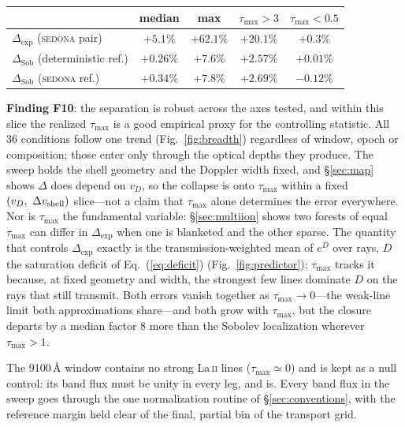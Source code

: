 \documentclass[fleqn,usenatbib]{mnras}
\newcommand{\dexp}{\Delta_{\mathrm{exp}}}
\newcommand{\dsobp}{\Delta_{\mathrm{Sob}}}
\begin{document}
\begin{table}
\centering
\small
\begin{tabular}{@{}lcccc@{}}
\toprule
 & median & max & $\tau_{\max}>3$ & $\tau_{\max}<0.5$ \\
\midrule
$\dexp$ (\textsc{sedona} pair) & $+5.1\%$ & $\mathbf{+62.1\%}$ & $+20.1\%$ & $+0.3\%$ \\
$\dsobp$ (deterministic ref.) & $+0.26\%$ & $\mathbf{+7.6\%}$ & $+2.57\%$ & $+0.01\%$ \\
$\dsobp$ (\textsc{sedona} ref.) & $+0.34\%$ & $+7.8\%$ & $+2.69\%$ & $-0.12\%$ \\
\bottomrule
\end{tabular}
\end{table}

\textbf{Finding F10}: the separation is robust across the axes tested, and
within this slice the realized $\tau_{\max}$ is a good empirical proxy for the
controlling statistic. All 36 conditions follow one trend
(Fig.~\ref{fig:breadth}) regardless of window, epoch or composition; those
enter only through the optical depths they produce. The sweep holds the shell
geometry and the Doppler width fixed, and \S\ref{sec:map} shows $\Delta$ does
depend on $v_D$, so the collapse is onto $\tau_{\max}$ within a fixed
$(v_D,\ \Delta v_{\rm shell})$ slice---not a claim that $\tau_{\max}$ alone
determines the error everywhere. Nor is $\tau_{\max}$ the fundamental
variable: \S\ref{sec:multiion} shows two forests of equal $\tau_{\max}$ can
differ in $\dexp$ when one is blanketed and the other sparse. The quantity
that controls $\dexp$ exactly is the transmission-weighted mean of $e^{D}$
over rays, $D$ the saturation deficit of Eq.~(\ref{eq:deficit})
(Fig.~\ref{fig:predictor}); $\tau_{\max}$ tracks it because, at fixed
geometry and width, the strongest few lines dominate $D$ on the rays that
still transmit. Both errors vanish together as $\tau_{\max}\to0$---the
weak-line limit both approximations share---and both grow with $\tau_{\max}$,
but the closure departs by a median factor $8$ more than
the Sobolev localization wherever $\tau_{\max}>1$.

The 9100\,\AA{} window contains no strong La\,\textsc{ii} lines
($\tau_{\max}\simeq0$) and is kept as a null control: its band flux must be
unity in every leg, and is. Every band flux in the sweep goes through the one
normalization routine of \S\ref{sec:conventions}, with the reference margin
held clear of the final, partial bin of the transport grid.
\end{document}
